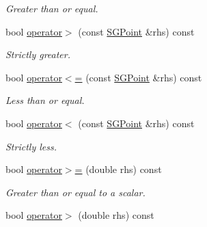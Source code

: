 \begin{DoxyCompactItemize}
\begin{DoxyCompactList}\small\item\em Greater than or equal. \end{DoxyCompactList}\item 
\hypertarget{classSGPoint_af25174b953cb6aa24ef0484d6b39329d}{bool \hyperlink{classSGPoint_af25174b953cb6aa24ef0484d6b39329d}{operator$>$} (const \hyperlink{classSGPoint}{S\-G\-Point} \&rhs) const }\label{classSGPoint_af25174b953cb6aa24ef0484d6b39329d}

\begin{DoxyCompactList}\small\item\em Strictly greater. \end{DoxyCompactList}\item 
\hypertarget{classSGPoint_a8ce2d72b4096a843f8f8537d84f06400}{bool \hyperlink{classSGPoint_a8ce2d72b4096a843f8f8537d84f06400}{operator$<$=} (const \hyperlink{classSGPoint}{S\-G\-Point} \&rhs) const }\label{classSGPoint_a8ce2d72b4096a843f8f8537d84f06400}

\begin{DoxyCompactList}\small\item\em Less than or equal. \end{DoxyCompactList}\item 
\hypertarget{classSGPoint_af4baa20da0c4a8524967140e2eb44497}{bool \hyperlink{classSGPoint_af4baa20da0c4a8524967140e2eb44497}{operator$<$} (const \hyperlink{classSGPoint}{S\-G\-Point} \&rhs) const }\label{classSGPoint_af4baa20da0c4a8524967140e2eb44497}

\begin{DoxyCompactList}\small\item\em Strictly less. \end{DoxyCompactList}\item 
\hypertarget{classSGPoint_a72c9a64d7ab038f5ca190cb5e433477f}{bool \hyperlink{classSGPoint_a72c9a64d7ab038f5ca190cb5e433477f}{operator$>$=} (double rhs) const }\label{classSGPoint_a72c9a64d7ab038f5ca190cb5e433477f}

\begin{DoxyCompactList}\small\item\em Greater than or equal to a scalar. \end{DoxyCompactList}\item 
\hypertarget{classSGPoint_a21fe5672c770edc189bb86fcdde5c66d}{bool \hyperlink{classSGPoint_a21fe5672c770edc189bb86fcdde5c66d}{operator$>$} (double rhs) const }\label{classSGPoint_a21fe5672c770edc189bb86fcdde5c66d}


\end{DoxyCompactItemize}
